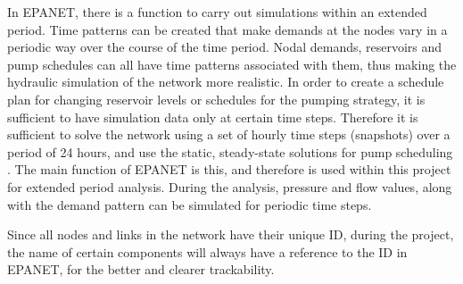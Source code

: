 In EPANET, there is a function to carry out simulations within an extended period. Time patterns can be created that make demands at the nodes vary in a periodic way over the course of the time period. Nodal demands, reservoirs and pump schedules can all have time patterns associated with them, thus making the hydraulic simulation of the network more realistic. In order to create a schedule plan for changing reservoir levels or schedules for the pumping strategy, it is sufficient to have simulation data only at certain time steps. Therefore it is sufficient to solve the network using a set of hourly time steps (snapshots) over a period of 24 hours, and use the static, steady-state solutions for pump scheduling \cite{agency2016epanet}. The main function of EPANET is this, and therefore is used within this project for extended period analysis. During the analysis, pressure and flow values, along with the demand pattern can be simulated for periodic time steps. 

Since all nodes and links in the network have their unique ID, during the project, the name of certain components will always have a reference to the ID in EPANET, for the better and clearer trackability. 









